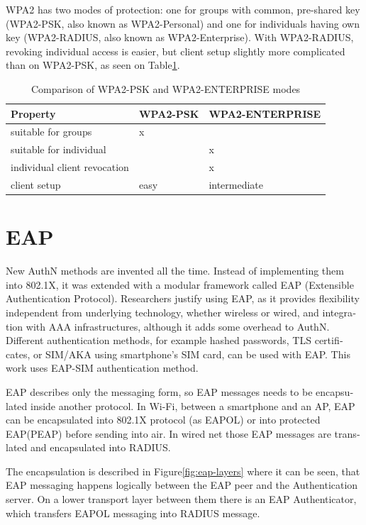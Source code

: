 \documentclass[12pt,a4paper,english]{tutthesis}
\begin{document}
\begin{otherlanguage}{english}
WPA2 has two modes of protection: one for groups with common, pre-shared
key (WPA2-PSK, also known as WPA2-Personal) and one for individuals
having own key (WPA2-RADIUS, also known as  WPA2-Enterprise).  With WPA2-RADIUS, revoking
individual access is easier, but client setup slightly more
complicated than on WPA2-PSK, as seen on Table\ref{psk-enterprise}.

\begin{table}[htb]
\caption{\label{psk-enterprise}Comparison of WPA2-PSK and WPA2-ENTERPRISE modes}
\centering
\begin{tabular}{l|l|l}
Property & WPA2-PSK & WPA2-ENTERPRISE\\
\hline
suitable for groups & x & \\
suitable for individual &  & x\\
individual client revocation &  & x\\
client setup & easy & intermediate\\
\hline
\end{tabular}
\end{table}


\section{EAP}
\label{sec-2-4}

New AuthN methods are invented all the time.
Instead of implementing them into 802.1X, it was 
extended with a modular framework called 
 EAP (Extensible Authentication Protocol)\cite{rfc5247}. 
Researchers justify using EAP, as it
provides flexibility independent from underlying technology, whether
wireless or wired,  and integration with AAA infrastructures, although
it adds some overhead to AuthN\cite{pereniguez10}.
Different authentication methods, for example hashed passwords, TLS
 certificates, or SIM/AKA using smartphone's SIM card,  can
be used with EAP.
This work uses EAP-SIM authentication method.


EAP describes only the messaging form, so EAP messages needs to
be encapsulated inside another protocol.  In Wi-Fi, between a smartphone
and an AP, EAP can be encapsulated into 802.1X protocol (as EAPOL) or
into protected EAP(PEAP)\cite{peap} before sending
into air. In wired net those EAP messages are translated and encapsulated into RADIUS.

The encapsulation is described in Figure\ref{fig:eap-layers} where it can be
seen, that EAP messaging happens logically between the EAP peer and
the Authentication server. On a lower transport layer between them
there is an EAP Authenticator, which transfers EAPOL messaging into
RADIUS message.


\end{otherlanguage}
\end{document}
